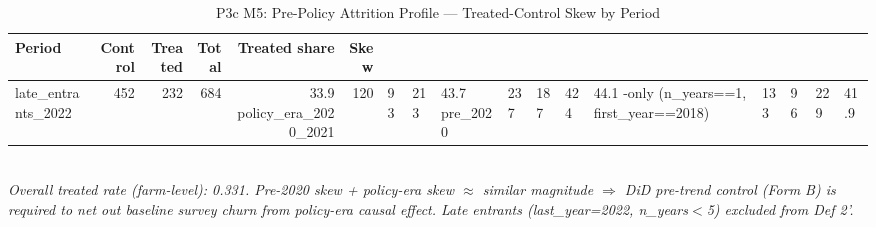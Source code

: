 \begin{table}[t]
\centering
\caption{P3c M5: Pre-Policy Attrition Profile — Treated-Control Skew by Period}
\label{tab:ch5_attrition_profile_en}
\begin{tabular}{lrrrrr}
\toprule
Period & Control & Treated & Total & Treated share & Skew \\
\midrule
late_entrants_2022 & 452 & 232 & 684 & 33.9%
policy_era_2020_2021 & 120 & 93 & 213 & 43.7%
pre_2020 & 237 & 187 & 424 & 44.1%
-only (n\_years==1, first\_year==2018) & 133 & 96 & 229 & 41.9%
\bottomrule
\end{tabular}\\
\footnotesize\textit{Overall treated rate (farm-level): 0.331. Pre-2020 skew + policy-era skew $\approx$ similar magnitude $\Rightarrow$ DiD pre-trend control (Form B) is required to net out baseline survey churn from policy-era causal effect. Late entrants (last\_year=2022, n\_years$<$5) excluded from Def 2'.}
\end{table}

